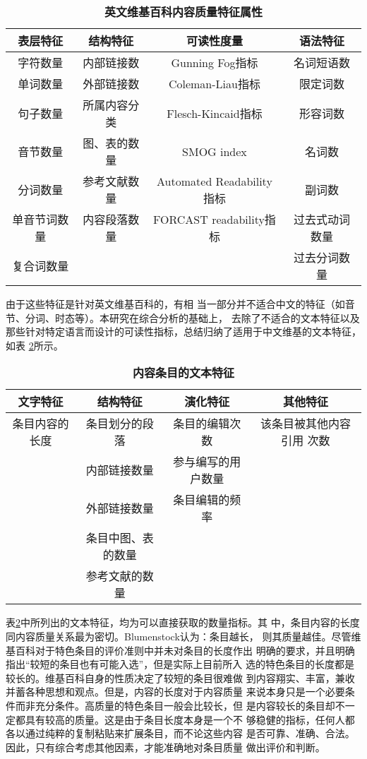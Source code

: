 \begin{table}[!htb]
  \centering
  \small
\caption{\small{\textbf{英文维基百科内容质量特征属性}}} 
 \begin{tabular}{|c|c|c|c|}
    \hline
    表层特征&结构特征&可读性度量&语法特征\\\hline
    字符数量&内部链接数\footnotemark[1]&Gunning Fog指标&名词短语数\\\hline
    单词数量&外部链接数\footnotemark[2]&Coleman-Liau指标&限定词数\\\hline
    句子数量&所属内容分类&Flesch-Kincaid指标&形容词数\\\hline
    音节数量&图、表的数量&SMOG index&名词数\\\hline
    分词数量&参考文献数量&Automated Readability指标&副词数\\\hline
    单音节词数量&内容段落数量&FORCAST readability指标&过去式动词数量\\\hline
    复合词数量& & &过去分词数量\\\hline
  \end{tabular}

  \label{tab:en-wiki-character}
\end{table}
由于这些特征是针对英文维基百科的，有相
当一部分并不适合中文的特征（如音节、分词、时态等）。本研究在综合分析的基础上，
去除了不适合的文本特征以及那些针对特定语言而设计的可读性指标，总结归纳了适用于中文维基的文本特征，如表
\ref{text-feature}所示。
\begin{table}[!htb]
  \centering
\small
\caption{\small{\bf{内容条目的文本特征}}} 
 \begin{tabular}{|c|c|c|c|}
 \hline
    文字特征&结构特征&演化特征&其他特征\\\hline
    条目内容的长度&条目划分的段落&条目的编辑次数&该条目被其他内容引用
    次数\\
 &内部链接数量&参与编写的用户数量&\\
 &外部链接数量&条目编辑的频率& \\
 &条目中图、表的数量& &\\
  &参考文献的数量&& \\\hline
  \end{tabular}
  
  \label{text-feature}
\end{table}

表\ref{text-feature}中所列出的文本特征，均为可以直接获取的数量指标。其
中，条目内容的长度同内容质量关系最为密切。Blumenstock认为：条目越长，
则其质量越佳。尽管维基百科对于特色条目的评价准则中并未对条目的长度作出
明确的要求，并且明确指出“较短的条目也有可能入选”，但是实际上目前所入
选的特色条目的长度都是较长的。维基百科自身的性质决定了较短的条目很难做
到内容翔实、丰富，兼收并蓄各种思想和观点。但是，内容的长度对于内容质量
来说本身只是一个必要条件而非充分条件。高质量的特色条目一般会比较长，但
是内容较长的条目却不一定都具有较高的质量。这是由于条目长度本身是一个不
够稳健的指标，任何人都各以通过纯粹的复制粘贴来扩展条目，而不论这些内容
是否可靠、准确、合法。因此，只有综合考虑其他因素，才能准确地对条目质量
做出评价和判断。

